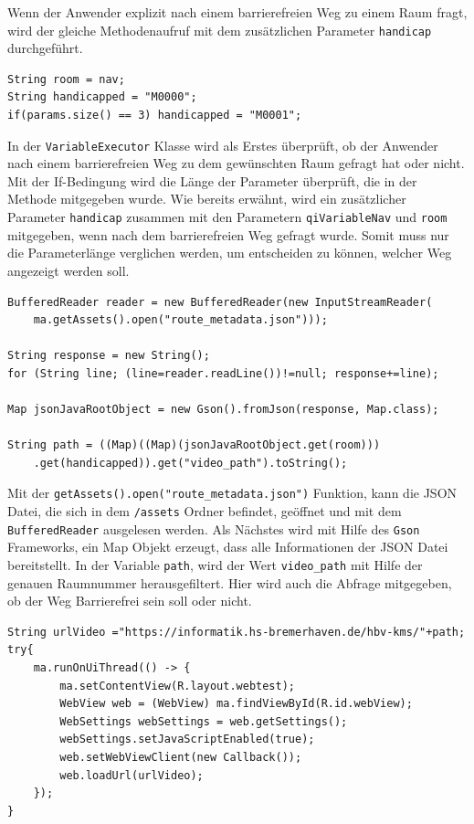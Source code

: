 Wenn der Anwender explizit nach einem barrierefreien Weg zu einem Raum fragt, wird der gleiche Methodenaufruf mit dem zusätzlichen 
Parameter \verb|handicap| durchgeführt.\\

\begin{lstlisting}
String room = nav;
String handicapped = "M0000";
if(params.size() == 3) handicapped = "M0001";
\end{lstlisting}


In der \verb|VariableExecutor| Klasse wird als Erstes überprüft, ob der Anwender nach einem barrierefreien Weg zu dem gewünschten Raum 
gefragt hat oder nicht. Mit der If-Bedingung wird die Länge der Parameter überprüft, die in der Methode mitgegeben wurde. 
Wie bereits erwähnt, wird ein zusätzlicher Parameter \verb|handicap| zusammen mit den Parametern \verb|qiVariableNav| 
und \verb|room| mitgegeben, wenn nach dem barrierefreien Weg gefragt wurde. Somit muss nur die Parameterlänge verglichen 
werden, um entscheiden zu können, welcher Weg angezeigt werden soll.\\

\begin{lstlisting}
BufferedReader reader = new BufferedReader(new InputStreamReader(
    ma.getAssets().open("route_metadata.json")));

String response = new String();
for (String line; (line=reader.readLine())!=null; response+=line);

Map jsonJavaRootObject = new Gson().fromJson(response, Map.class);

String path = ((Map)((Map)(jsonJavaRootObject.get(room)))
    .get(handicapped)).get("video_path").toString();
\end{lstlisting}

Mit der \verb|getAssets().open("route_metadata.json")| Funktion, kann die JSON Datei, die sich in dem \verb|/assets| 
Ordner befindet, geöffnet und mit dem \verb|BufferedReader| ausgelesen werden. Als Nächstes wird mit Hilfe des \verb|Gson| Frameworks, 
ein Map Objekt erzeugt, dass alle Informationen der JSON Datei bereitstellt. In der Variable \verb|path|, wird der Wert 
\verb|video_path| mit Hilfe der genauen Raumnummer herausgefiltert. Hier wird auch die Abfrage mitgegeben, ob der Weg 
Barrierefrei sein soll oder nicht.\\


\begin{lstlisting}
String urlVideo ="https://informatik.hs-bremerhaven.de/hbv-kms/"+path;
try{
    ma.runOnUiThread(() -> {
        ma.setContentView(R.layout.webtest);
        WebView web = (WebView) ma.findViewById(R.id.webView);
        WebSettings webSettings = web.getSettings();
        webSettings.setJavaScriptEnabled(true);
        web.setWebViewClient(new Callback());
        web.loadUrl(urlVideo);
    });
}
\end{lstlisting}

